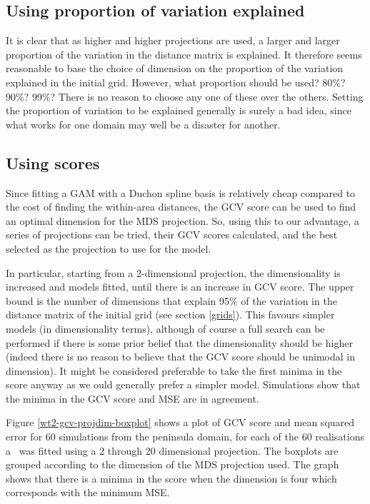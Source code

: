 \subsection{Using proportion of variation explained}

It is clear that as higher and higher projections are used, a larger and larger proportion of the variation in the distance matrix is explained. It therefore seems reasonable to base the choice of dimension on the proportion of the variation explained in the initial grid. However, what proportion should be used? 80\%? 90\%? 99\%? There is no reason to choose any one of these over the others. Setting the proportion of variation to be explained generally is surely a bad idea, since what works for one domain may well be a disaster for another.

\subsection{Using scores}

Since fitting a GAM with a Duchon spline basis is relatively cheap compared to the cost of finding the within-area distances, the GCV score can be used to find an optimal dimension for the MDS projection. So, using this to our advantage, a series of projections can be tried, their GCV scores calculated, and the best selected as the projection to use for the model.

In particular, starting from a 2-dimensional projection, the dimensionality is increased  and models fitted, until there is an increase in GCV score. The upper bound is the number of dimensions that explain 95\% of the variation in the distance matrix of the initial grid (see section \ref{grids}).  This favours simpler models (in dimensionality terms), although of course a full search can be performed if there is some prior belief that the dimensionality should be higher (indeed there is no reason to believe that the GCV score should be unimodal in dimension). It might be considered preferable to take the first minima in the score anyway as we ould generally prefer a simpler model. Simulations show that the minima in the GCV score and MSE are in agreement.

Figure \ref{wt2-gcv-projdim-boxplot} shows a plot of GCV score and mean squared error for 60 simulations from the peninsula domain, for each of the 60 realisations a \mdsds\ was fitted using a 2 through 20 dimensional projection. The boxplots are grouped according to the dimension of the MDS projection used. The graph shows that there is a minima in the score when the dimension is four which corresponds with the minimum MSE.

